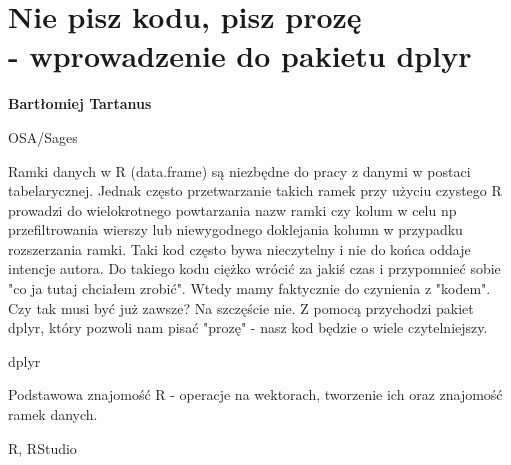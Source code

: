 \documentclass[\main/boa.tex]{subfiles}
\begin{document}
\section[Nie pisz kodu, pisz prozę - wprowadzenie do pakietu dplyr]{Nie pisz kodu, pisz prozę \\- wprowadzenie do pakietu dplyr}

\begin{minipage}{0.915\textwidth}
\centering
{\bf {} Bartłomiej Tartanus}
\end{minipage}

\vskip 0.3cm

\begin{affiliations}
\begin{minipage}{0.915\textwidth}
\centering
\large OSA/Sages  \\[2pt]
\end{minipage}
\end{affiliations}

\vskip 0.8cm

\opiswarsztatu Ramki danych w R (data.frame) są niezbędne do pracy z danymi w postaci tabelarycznej. Jednak często przetwarzanie takich ramek przy użyciu czystego R prowadzi do wielokrotnego powtarzania nazw ramki czy kolum w celu np przefiltrowania wierszy lub niewygodnego doklejania kolumn w przypadku rozszerzania ramki. Taki kod często bywa nieczytelny i nie do końca oddaje intencje autora. Do takiego kodu ciężko wrócić za jakiś czas i przypomnieć sobie "co ja tutaj chciałem zrobić". Wtedy mamy faktycznie do czynienia z "kodem". Czy tak musi być już zawsze? Na szczęście nie. Z pomocą przychodzi pakiet dplyr, który pozwoli nam pisać "prozę" - nasz kod będzie o wiele czytelniejszy.	 

\pakiety dplyr

\umiejetnosci Podstawowa znajomość R - operacje na wektorach, tworzenie ich oraz znajomość ramek danych.

\wymagania R, RStudio
\end{document}
